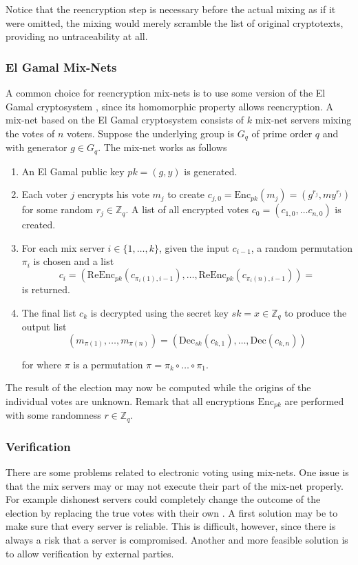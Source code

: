 Notice that the reencryption step is necessary before the actual
mixing as if it were omitted, the mixing would merely scramble the
list of original cryptotexts, providing no untraceability at all.

\subsubsection{El Gamal Mix-Nets}

A common choice for reencryption mix-nets is to use some version of
the El Gamal cryptosystem \cite{electronicvoting}, since its
homomorphic property allows reencryption. A mix-net based on the El
Gamal cryptosystem consists of $k$ mix-net servers mixing the votes of
$n$ voters. Suppose the underlying group is $G_q$ of prime order $q$
and with generator $g \in G_q$. The mix-net works as follows
\cite{electronicvoting2}\\

\begin{enumerate}
\item An El Gamal public key $pk = (g,y)$ is generated.
\item Each voter $j$ encrypts his vote $m_j$ to create $c_{j,0} =
  \mathrm{Enc}_{pk}(m_j) = (g^{r_j},my^{r_j})$ for some random $r_j
  \in \mathbb{Z}_q$.  A list of all encrypted votes $c_0 = \left(
  c_{1,0}, \hdots c_{n,0}\right)$ is created.
\item For each mix server $i \in \{1,\hdots, k\}$, given the input
  $c_{i-1}$, a random permutation $\pi _i$ is chosen and a list 
  $$ 
  c_i =\left(\mathrm{ReEnc}_{pk}(c_{\pi_i(1),i-1}), \hdots,
  \mathrm{ReEnc}_{pk}(c_{\pi_i(n), i-1})\right) =
  $$
  is returned.
\item The final list $c_k$ is decrypted using the secret key $sk = x
  \in \mathbb{Z}_q$ to produce the output list
 $$ 
  (m_{\pi (1)}, \hdots , m_{\pi (n)}) =
  \left(\mathrm{Dec}_{sk}(c_{k,1}), \hdots, \mathrm{Dec}(c_{k,n})\right)
  $$
  
  for where $\pi$ is a permutation $\pi = \pi_k \circ \hdots \circ
  \pi_1$.
\end{enumerate}

 The result of the election may now be computed while the origins of
 the individual votes are unknown. Remark that all encryptions
 $\mathrm{Enc}_{pk}$ are performed with some randomness $r \in
 \mathbb{Z}_q$.

\subsubsection{Verification}
There are some problems related to electronic voting using
mix-nets. One issue is that the mix servers may or may not execute
their part of the mix-net properly. For example dishonest servers
could completely change the outcome of the election by replacing the
true votes with their own \cite{electronicvoting}. A first solution
may be to make sure that every server is reliable. This is difficult,
however, since there is always a risk that a server is
compromised. Another and more feasible solution is to allow
verification by external parties.

